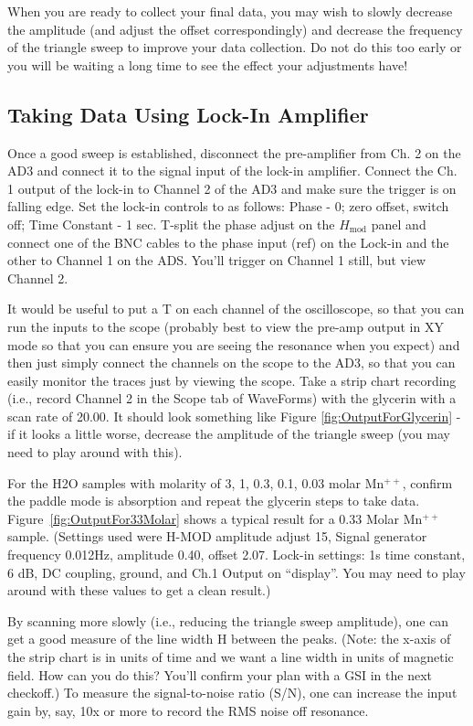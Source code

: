 \documentclass{../lab}
\begin{document}
When you are ready to collect your final data, you may wish to slowly decrease the amplitude (and adjust the offset correspondingly) and decrease the frequency of the triangle sweep to improve your data collection. Do not do this too early or you will be waiting a long time to see the effect your adjustments have!

\subsection{Taking Data Using Lock-In Amplifier}

Once a good sweep is established, disconnect the pre-amplifier from Ch. 2 on the AD3 and connect it to the signal input of the lock-in amplifier. Connect the Ch. 1 output of the lock-in to Channel 2 of the AD3 and make sure the trigger is on falling edge. Set the lock-in controls to as follows: Phase - 0; zero offset, switch off; Time Constant - 1 sec. T-split the phase adjust on the $H_\text{mod}$ panel and connect one of the BNC cables to the phase input (ref) on the Lock-in and the other to Channel 1 on the ADS. You'll trigger on Channel 1 still, but view Channel 2.

It would be useful to put a T on each channel of the oscilloscope, so that you can run the inputs to the scope (probably best to view the pre-amp output in XY mode so that you can ensure you are seeing the resonance when you expect) and then just simply connect the channels on the scope to the AD3, so that you can easily monitor the traces just by viewing the scope. Take a strip chart recording (i.e., record Channel 2 in the Scope tab of WaveForms) with the glycerin with a scan rate of 20.00. It should look something like Figure \ref{fig:OutputForGlycerin} - if it looks a little worse, decrease the amplitude of the triangle sweep (you may need to play around with this).

For the H2O samples with molarity of 3, 1, 0.3, 0.1, 0.03 molar Mn$^{++}$, confirm the paddle mode is absorption and repeat the glycerin steps to take data. Figure~\ref{fig:OutputFor33Molar} shows a typical result for a 0.33 Molar  Mn$^{++}$ sample. (Settings used were H-MOD amplitude adjust 15, Signal generator frequency 0.012Hz, amplitude 0.40, offset 2.07. Lock-in settings: 1s time constant, 6 dB, DC coupling, ground, and Ch.1 Output on ``display''. You may need to play around with these values to get a clean result.) 

By scanning more slowly (i.e., reducing the triangle sweep amplitude), one can get a good measure of the line width H between the peaks. (Note: the x-axis of the strip chart is in units of time and we want a line width in units of magnetic field. How can you do this? You'll confirm your plan with a GSI in the next checkoff.) To measure the signal-to-noise ratio (S/N), one can increase the input gain by, say, 10x or more to record the RMS noise off resonance. 
\end{document}
